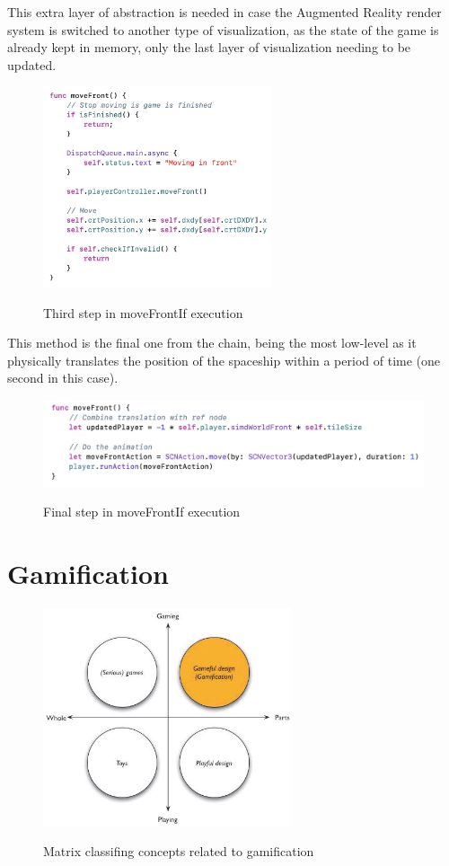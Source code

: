 \documentclass[12 pct]{report}
\begin{document}
This extra layer of abstraction is needed in case the Augmented Reality render system is switched to another type of visualization, as the state of the game is already kept in memory, only the last layer of visualization needing to be updated.
\begin{figure}[H]
\includegraphics[width=0.6\textwidth]{move-front-if-3}
\centering
\label{fig:feature-points}
\caption{ Third step in moveFrontIf execution }
\end{figure}

This method is the final one from the chain, being the most low-level as it physically translates the position of the spaceship within a period of time (one second in this case).
\begin{figure}[H]
\includegraphics[width=1.0\textwidth]{move-front-if-4}
\centering
\label{fig:feature-points}
\caption{ Final step in moveFrontIf execution}
\end{figure}


\section{Gamification}
\begin{figure}[H]
\includegraphics[width=0.65\textwidth]{gamification}
\centering
\label{fig:feature-points}
\caption{ Matrix classifing concepts related to gamification \cite{deterding2011gamification} }
\end{figure}
\end{document}
